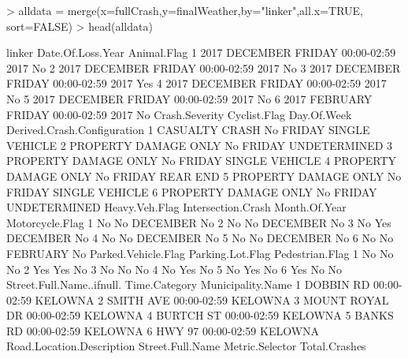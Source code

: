 \documentclass[11pt, a4paper]{article}
\begin{document}
\begin{Schunk}
\begin{Sinput}
> alldata = merge(x=fullCrash,y=finalWeather,by="linker",all.x=TRUE, sort=FALSE)
> head(alldata)
\end{Sinput}
\begin{Soutput}
                            linker Date.Of.Loss.Year Animal.Flag
1 2017 DECEMBER FRIDAY 00:00-02:59              2017          No
2 2017 DECEMBER FRIDAY 00:00-02:59              2017          No
3 2017 DECEMBER FRIDAY 00:00-02:59              2017         Yes
4 2017 DECEMBER FRIDAY 00:00-02:59              2017          No
5 2017 DECEMBER FRIDAY 00:00-02:59              2017          No
6 2017 FEBRUARY FRIDAY 00:00-02:59              2017          No
        Crash.Severity Cyclist.Flag Day.Of.Week Derived.Crash.Configuration
1       CASUALTY CRASH           No      FRIDAY              SINGLE VEHICLE
2 PROPERTY DAMAGE ONLY           No      FRIDAY                UNDETERMINED
3 PROPERTY DAMAGE ONLY           No      FRIDAY              SINGLE VEHICLE
4 PROPERTY DAMAGE ONLY           No      FRIDAY                    REAR END
5 PROPERTY DAMAGE ONLY           No      FRIDAY              SINGLE VEHICLE
6 PROPERTY DAMAGE ONLY           No      FRIDAY                UNDETERMINED
  Heavy.Veh.Flag Intersection.Crash Month.Of.Year Motorcycle.Flag
1             No                 No      DECEMBER              No
2             No                 No      DECEMBER              No
3             No                Yes      DECEMBER              No
4             No                 No      DECEMBER              No
5             No                 No      DECEMBER              No
6             No                 No      FEBRUARY              No
  Parked.Vehicle.Flag Parking.Lot.Flag Pedestrian.Flag
1                  No               No              No
2                 Yes              Yes              No
3                  No               No              No
4                  No              Yes              No
5                  No              Yes              No
6                 Yes               No              No
  Street.Full.Name..ifnull. Time.Category Municipality.Name
1                 DOBBIN RD   00:00-02:59           KELOWNA
2                 SMITH AVE   00:00-02:59           KELOWNA
3            MOUNT ROYAL DR   00:00-02:59           KELOWNA
4                 BURTCH ST   00:00-02:59           KELOWNA
5                  BANKS RD   00:00-02:59           KELOWNA
6                    HWY 97   00:00-02:59           KELOWNA
       Road.Location.Description Street.Full.Name Metric.Selector Total.Crashes

\end{Soutput}
\end{Schunk}
\end{document}
